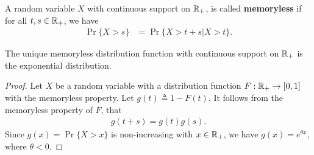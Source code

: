 \documentclass[a4paper,10pt,english]{article}
\begin{document}
\begin{defn} A random variable $X$ with continuous support on $\mathbb{R}_+$, is called \textbf{memoryless} if for all $t,s \in \mathbb{R}_+$, we have
\begin{align*}
  \Pr\{X>s\} &= \Pr\{ X > t+s| X>t\}.%
\end{align*}
\end{defn}
\begin{prop} The unique memoryless distribution function with continuous support on $\mathbb{R}_+$ is the exponential distribution.
\end{prop}
\begin{proof}
Let $X$ be a random variable with a distribution function $F: \mathbb{R}_+ \to [0,1]$ with the memoryless property. Let $g(t) \triangleq 1 - F(t)$. It follows from the memoryless property of $F$, that
\begin{align*}
 g(t+s) = g(t)g(s).
\end{align*}
%
Since $g(x) = \Pr\{X > x\}$  is non-increasing  with $x \in \mathbb{R}_+$, we have $g(x) = e^{\theta x}$, where $\theta < 0$.
\end{proof}
\end{document}
